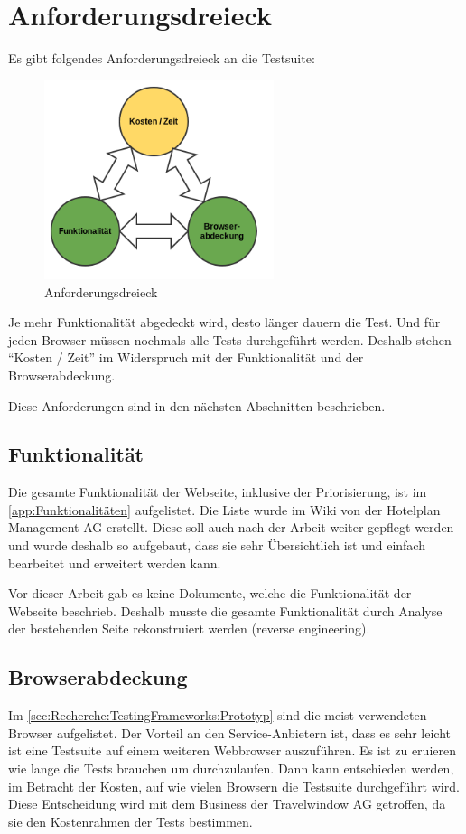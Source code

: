 \section{Anforderungsdreieck}
Es gibt folgendes Anforderungsdreieck an die Testsuite:
\begin{figure}[H]
	\centering
	\includegraphics[width=0.6\textwidth]{images/triangle.png}
	\caption{Anforderungsdreieck}
	\label{fig:analyse:Anforderungsdreieck}
\end{figure}

Je mehr Funktionalität abgedeckt wird, desto länger dauern die Test. Und für jeden Browser müssen nochmals alle Tests durchgeführt werden. Deshalb stehen "`Kosten / Zeit"' im Widerspruch mit der Funktionalität und der Browserabdeckung.

Diese Anforderungen sind in den nächsten Abschnitten beschrieben.

\subsection{Funktionalität}
\label{sec:analyse:Funktionalität}
Die gesamte Funktionalität der Webseite, inklusive der Priorisierung, ist im \cref{app:Funktionalitäten}  aufgelistet. Die Liste wurde im Wiki von der Hotelplan Management AG erstellt. Diese soll auch nach der Arbeit weiter gepflegt werden und wurde deshalb so aufgebaut, dass sie sehr Übersichtlich ist und einfach bearbeitet und erweitert werden kann.

Vor dieser Arbeit gab es keine Dokumente, welche die Funktionalität der Webseite beschrieb. Deshalb musste die gesamte Funktionalität durch Analyse der bestehenden Seite rekonstruiert werden (reverse engineering).

\subsection{Browserabdeckung}
Im \cref{sec:Recherche:TestingFrameworks:Prototyp}  sind die meist verwendeten Browser aufgelistet. Der Vorteil an den Service-Anbietern ist, dass es sehr leicht ist eine Testsuite auf einem weiteren Webbrowser auszuführen. Es ist zu eruieren wie lange die Tests brauchen um durchzulaufen. Dann kann entschieden werden, im Betracht der Kosten, auf wie vielen Browsern die Testsuite durchgeführt wird. Diese Entscheidung wird mit dem Business der Travelwindow AG getroffen, da sie den Kostenrahmen der Tests bestimmen.

